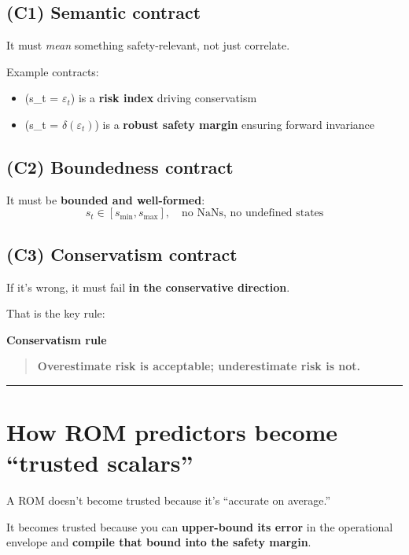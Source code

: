 \documentclass[11pt,a4paper]{article}
\begin{document}
\subsection*{\textbf{(C1) Semantic contract}}

It must \textit{mean} something safety-relevant, not just correlate.

Example contracts:

\begin{itemize}
\item (s\_t = $\varepsilon_t$) is a \textbf{risk index} driving conservatism
\item (s\_t = $\delta(\varepsilon_t)$) is a \textbf{robust safety margin} ensuring forward invariance
\end{itemize}

\subsection*{\textbf{(C2) Boundedness contract}}

It must be \textbf{bounded and well-formed}:
\[
s_t \in [s_{\min}, s_{\max}], \quad \text{no NaNs, no undefined states}
\]

\subsection*{\textbf{(C3) Conservatism contract}}

If it’s wrong, it must fail \textbf{in the conservative direction}.

That is the key rule:

\begin{schema}
\textbf{Conservatism rule}\\[-0.25em]
\begin{quote}
\textbf{Overestimate risk is acceptable; underestimate risk is not.}
\end{quote}
\end{schema}

\hrule
\vspace{0.75em}

\section{How ROM predictors become ``trusted scalars''}

A ROM doesn’t become trusted because it’s ``accurate on average.''

It becomes trusted because you can \textbf{upper-bound its error} in the operational envelope and \textbf{compile that bound into the safety margin}.
\end{document}
